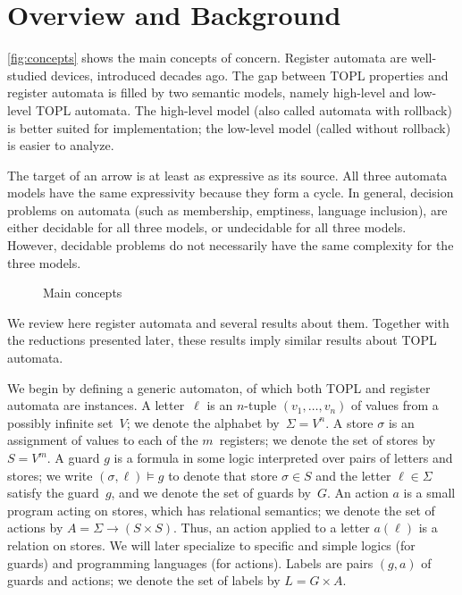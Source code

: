 \documentclass[9pt, preprint]{sigplanconf} %
\theoremstyle{definition}
\theoremstyle{remark}
\begin{document}
\section{Overview and Background}\label{sec:overview} %

\autoref{fig:concepts} shows the main concepts of concern.
Register automata are well-studied devices, introduced decades ago.
The gap between TOPL properties and register automata is filled by two semantic models, namely high-level  and low-level TOPL automata.
The high-level model (also called  automata with rollback) is better suited for implementation;
the low-level model (called without rollback) is easier to analyze.

The target of an arrow is at least as expressive as its source.
All three automata models have the same expressivity because they form a cycle.
In general, decision problems on automata (such as membership, emptiness, language inclusion), are either decidable for all three models, or undecidable for all three models.
However, decidable problems do not necessarily have the same complexity for the three models.

\begin{figure}[th]\centering
{}
\caption{Main concepts}
\label{fig:concepts}
\end{figure}

We review here register automata and several results about them.
Together with the reductions presented later, these results imply similar results about TOPL automata.

We begin by defining a generic automaton, of which both TOPL and register automata are instances.
A letter~$\ell$ is an $n$-tuple $(v_1,\ldots,v_n)$ of values from a possibly infinite set~$V$;
we denote the alphabet by~$\Sigma=V^n$.
A store $\sigma$ is an assignment of values to each of the $m$~registers;
we denote the set of stores by $S=V^m$.
A guard $g$ is a formula in some logic interpreted over pairs of letters and stores;
we write $(\sigma,\ell)\models g$ to denote that store $\sigma\in S$ and the letter $\ell\in\Sigma$ satisfy the guard~$g$, and we denote the set of guards by~$G$.
An action $a$ is a small program acting on stores, which has relational semantics;
we denote the set of actions by $A=\Sigma\to(S\times S)$.
Thus, an action applied to a letter $a(\ell)$ is a relation on stores.
We will later specialize to specific and simple logics (for guards) and programming languages (for actions).
Labels are pairs $(g,a)$ of guards and actions;
we denote the set of labels by $L=G\times A$.
\end{document}
